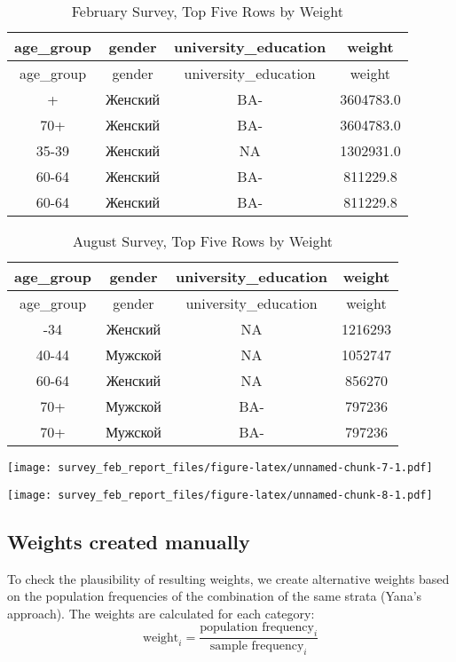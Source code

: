 \documentclass[
]{article}
\begin{document}
\begin{longtable}[]{@{}cccc@{}}
\caption{February Survey, Top Five Rows by Weight}\tabularnewline
\toprule\noalign{}
age\_group & gender & university\_education & weight \\
\midrule\noalign{}
\endfirsthead
\toprule\noalign{}
age\_group & gender & university\_education & weight \\
\midrule\noalign{}
\endhead
\bottomrule\noalign{}
\endlastfoot
70+ & Женский & BA- & 3604783.0 \\
70+ & Женский & BA- & 3604783.0 \\
35-39 & Женский & NA & 1302931.0 \\
60-64 & Женский & BA- & 811229.8 \\
60-64 & Женский & BA- & 811229.8 \\
\end{longtable}

\begin{longtable}[]{@{}cccc@{}}
\caption{August Survey, Top Five Rows by Weight}\tabularnewline
\toprule\noalign{}
age\_group & gender & university\_education & weight \\
\midrule\noalign{}
\endfirsthead
\toprule\noalign{}
age\_group & gender & university\_education & weight \\
\midrule\noalign{}
\endhead
\bottomrule\noalign{}
\endlastfoot
30-34 & Женский & NA & 1216293 \\
40-44 & Мужской & NA & 1052747 \\
60-64 & Женский & NA & 856270 \\
70+ & Мужской & BA- & 797236 \\
70+ & Мужской & BA- & 797236 \\
\end{longtable}

\texttt{[image: survey\_feb\_report\_files/figure-latex/unnamed-chunk-7-1.pdf]}

\texttt{[image: survey\_feb\_report\_files/figure-latex/unnamed-chunk-8-1.pdf]}

\hypertarget{weights-created-manually}{%
\subsection{Weights created manually}\label{weights-created-manually}}

To check the plausibility of resulting weights, we create alternative
weights based on the population frequencies of the combination of the
same strata (Yana's approach). The weights are calculated for each
category:
\[ \text{weight}_i = \frac{\text{population frequency}_i}{\text{sample frequency}_i} \]
\end{document}
